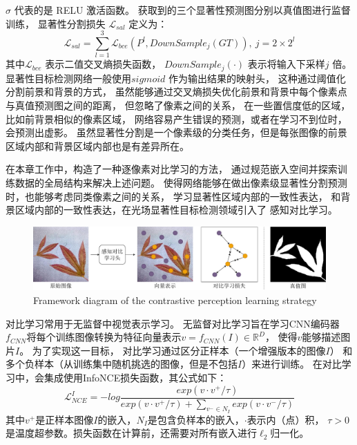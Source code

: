 $ \sigma $ 代表的是 RELU 激活函数。
获取到的三个显著性预测图分别以真值图进行监督训练，
显著性分割损失
$ \mathcal{L}_{sal} $
定义为：
%
%
%
%
\begin{equation}
	\mathcal{L}_{sal} = \sum_{l = 1}^{3}  
	\mathcal{L}_{bce} \left ( P^{l}, DownSample_{j}\left (  GT \right ) 
	\right ), ~ j = 2\times 2^l
	\label{chpt4:eq:loss_sal}
\end{equation}
%
%
%
%
其中$\mathcal{L}_{bce}$ 表示二值交叉熵损失函数，
$DownSample_{j}(\cdot)$ 表示将输入下采样$j$ 倍。
%
%
%
%
%
\label{chap:part4_cons}
% 
% 
% 
% 
显著性目标检测网络一般使用$sigmoid$ 作为输出结果的映射头，
这种通过阈值化分割前景和背景的方式，
虽然能够通过交叉熵损失优化前景和背景中每个像素点与真值预测图之间的距离，
但忽略了像素之间的关系，
在一些置信度低的区域，比如前背景相似的像素区域，
网络容易产生错误的预测，或者在学习不到位时，会预测出虚影。
%
%
%
%
虽然显著性分割是一个像素级的分类任务，但是每张图像的前景区域内部和背景区域内部也是有差异所在。

在本章工作中，构造了一种逐像素对比学习的方法，
通过规范嵌入空间并探索训练数据的全局结构来解决上述问题。
使得网络能够在做出像素级显著性分割预测时，也能够考虑同类像素之间的关系，
学习显著性区域内部的一致性表达，
和背景区域内部的一致性表达，在光场显著性目标检测领域引入了
感知对比学习。


\begin{figure}[!ht]
	\centering
	\includegraphics[width=\linewidth]{figures/chapter4/chpt4_cons_learning}
	{Framework diagram of the contrastive perception learning strategy}
	\label{chpt4:figure:cons_learning}
\end{figure}



对比学习常用于无监督中视觉表示学习。
无监督对比学习旨在学习CNN编码器$f_{CNN}$将每个训练图像转换为特征向量表示$v=f_{CNN}(I) \in \mathbb{R}^{D}$，
使得$v$能够描述图片$I$。
为了实现这一目标，
对比学习通过区分正样本（一个增强版本的图像$I$）
和多个负样本（从训练集中随机挑选的图像，但是不包括$I$）来进行训练。
在对比学习中，会集成使用InfoNCE损失函数，其公式如下：
\begin{equation}
	\mathcal{L} _{NCE}^{I}=-log \frac{exp(v \cdot v^{+ }/\tau )}
{exp(v \cdot v^{+}/\tau )+ \sum_{v^{-}\in N_{I}} exp(v \cdot v^{-}/\tau )} 
\label{chpt4_equ_nce}
\end{equation}
其中$v^{+}$是正样本图像$I$的嵌入，$N_{I}$是包含负样本的嵌入，$\cdot$表示内（点）积，
$\tau >0$是温度超参数。损失函数在计算前，还需要对所有嵌入进行$\ell_{2}$归一化。
\par
% 
% 
% 


